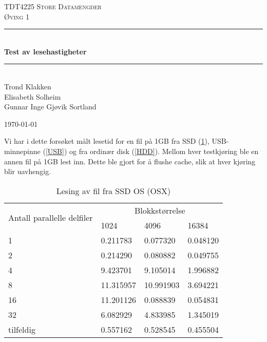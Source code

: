 \documentclass[titlepage]{article}
\newcommand{\HRule}{\rule{\linewidth}{0.5mm}}
\begin{document}
\begin{titlepage}
 
\begin{center}
 
\textsc{\LARGE TDT4225 Store Datamengder}\\[1.5cm]
\textsc{\Large Øving 1}\\[0.5cm]
 
\HRule \\[0.4cm]
{ \huge \bfseries Test av lesehastigheter}\\[0.4cm]
\HRule \\[1.5cm]

Trond Klakken \\
Elisabeth Solheim \\
Gunnar Inge Gjøvik Sortland

\vfill
 
{\large \today}
 
\end{center}

\end{titlepage}

Vi har i dette forsøket målt lesetid for en fil på 1GB fra SSD (\ref{SSD}), USB-minnepinne (\ref{USB}) og fra ordinær disk (\ref{HDD}). Mellom hver testkjøring ble en annen fil på 1GB lest inn. Dette ble gjort for å flushe cache, slik at hver kjøring blir uavhengig. 

\begin{table}[h!]
\caption{Lesing av fil fra SSD OS (OSX)}
\label{SSD}
\centering
\begin{tabular}{|l|l|l|l|}
\hline
\multirow{2}{*}{ Antall parallelle delfiler} & \multicolumn{3}{|c|}{Blokkstørrelse} \\
 & 1024 & 4096 & 16384\\
\hline
1         &  0.211783  &  0.077320  & 0.048120 \\
2         &  0.214290  &  0.080882  & 0.049755 \\
4         &  9.423701  &  9.105014  & 1.996882 \\
8         & 11.315957  & 10.991903  & 3.694221 \\
16        & 11.201126  &  0.088839  & 0.054831 \\
32        &  6.082929  &  4.833985  & 1.345019 \\
tilfeldig &  0.557162  &  0.528545  & 0.455504 \\
\hline
\end{tabular}
\end{table}
\end{document}
